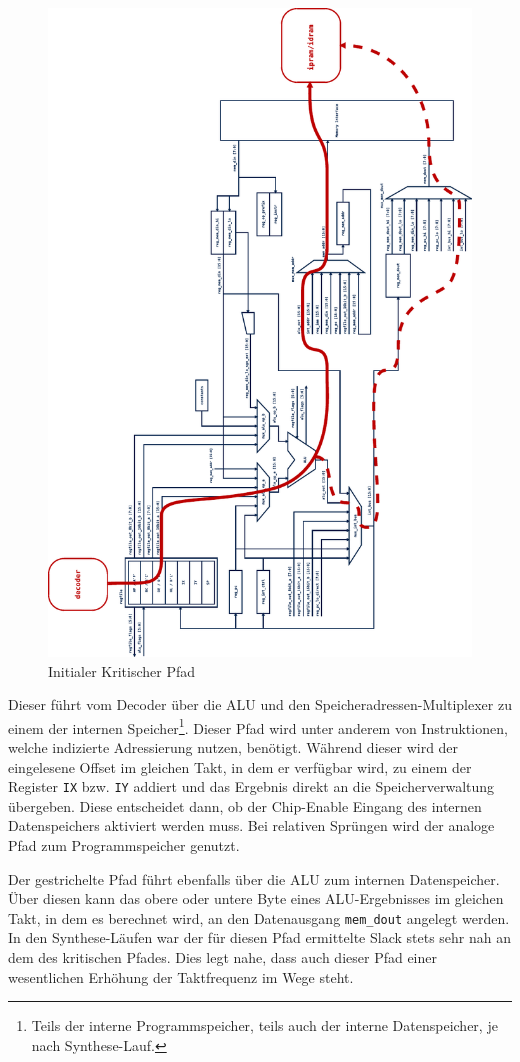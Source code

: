 \documentclass[ngerman, cd=lightcolor]{tudscrreprt}
\begin{document}
\begin{figure}[htbp]
  \centering
    \includegraphics[height=.95\textwidth,angle=-90]{resources/pdf/datapath-critical.pdf}
  \caption{Initialer Kritischer Pfad}
  \label{img:init-critical-path}
\end{figure}

\noindent
Dieser führt vom Decoder über die ALU und den Speicheradressen-Multiplexer zu
einem der internen Speicher\footnote{Teils der interne Programmspeicher, teils
auch der interne Datenspeicher, je nach Synthese-Lauf.}. Dieser Pfad wird unter
anderem von Instruktionen, welche indizierte Adressierung nutzen, benötigt.
Während dieser wird der eingelesene Offset im gleichen Takt, in dem er verfügbar
wird, zu einem der Register \texttt{IX} bzw. \texttt{IY} addiert und das
Ergebnis direkt an die Speicherverwaltung übergeben. Diese entscheidet dann, ob
der Chip-Enable Eingang des internen Datenspeichers aktiviert werden muss. Bei
relativen Sprüngen wird der analoge Pfad zum Programmspeicher genutzt.

Der gestrichelte Pfad führt ebenfalls über die ALU zum internen Datenspeicher.
Über diesen kann das obere oder untere Byte eines ALU-Ergebnisses im gleichen
Takt, in dem es berechnet wird, an den Datenausgang \texttt{mem\_dout} angelegt
werden. In den Synthese-Läufen war der für diesen Pfad ermittelte Slack stets
sehr nah an dem des kritischen Pfades. Dies legt nahe, dass auch dieser Pfad
einer wesentlichen Erhöhung der Taktfrequenz im Wege steht.
\end{document}
